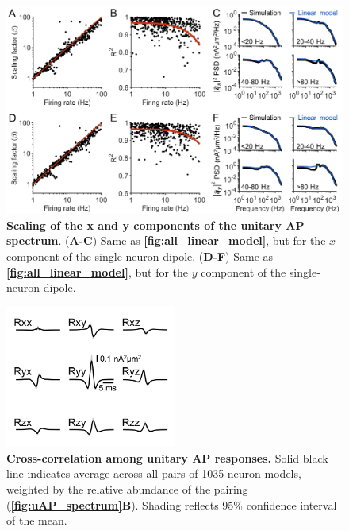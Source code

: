 \begin{figure}[h!]
    \centering
    \includegraphics[width=14cm]{Figures/chapter3/figureS1.png}
    \caption{\textbf{Scaling of the x and y components of the unitary AP spectrum}. (\textbf{A-C}) Same as \textbf{\autoref{fig:all_linear_model}}, but for the $x$ component of the single-neuron dipole. (\textbf{D-F}) Same as \textbf{\autoref{fig:all_linear_model}}, but for the $y$ component of the single-neuron dipole.} 
    \label{fig:linear_model_xy}
\end{figure}

\clearpage

\begin{figure}[h!]
    \centering
    \includegraphics[width=5.6cm]{Figures/chapter3/figureS2.png}
    \caption{\textbf{Cross-correlation among unitary AP responses.} Solid black line indicates average across all pairs of 1035 neuron models, weighted by the relative abundance of the pairing (\textbf{\autoref{fig:uAP_spectrum}B}). Shading reflects 95\% confidence interval of the mean.} 
    \label{fig:cross_ap_correlation}
\end{figure}

\clearpage

